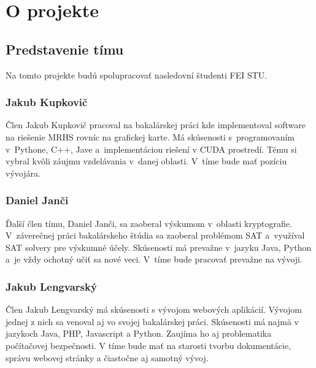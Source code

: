 
\section{O projekte}
\subsection{Predstavenie tímu}
Na tomto projekte budú spolupracovať nasledovní študenti FEI STU.
\subsubsection{Jakub Kupkovič}
Člen Jakub Kupkovič pracoval na bakalárskej práci kde implementoval software na riešenie MRHS rovníc na grafickej karte. Má skúsenosti s programovaním v Pythone, C++, Jave a implementáciou riešení v CUDA prostredí. Tému si vybral kvôli záujmu vzdelávania v danej oblasti. V tíme bude mať pozíciu vývojára. 
\subsubsection{Daniel Janči}
Ďalší člen tímu, Daniel Janči, sa zaoberal výskumom v oblasti kryptografie. V záverečnej práci bakalárskeho štúdia sa zaoberal problémom SAT a využíval SAT solvery pre výskumné účely. Skúsenosti má prevažne v jazyku Java, Python a je vždy ochotný učiť sa nové veci. V tíme bude pracovať prevažne na vývoji.
\subsubsection{Jakub Lengvarský}
Člen Jakub Lengvarský má skúsenosti s vývojom webových aplikácií. Vývojom jednej z nich sa venoval aj vo svojej bakalárskej práci. Skúsenosti má najmä v jazykoch Java, PHP, Javascript a Python. Zaujíma ho aj problematika počítačovej bezpečnosti. V tíme bude mať na starosti tvorbu dokumentácie, správu webovej stránky a čiastočne aj samotný vývoj.
